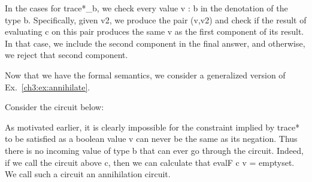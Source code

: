 \documentclass{llncs}
\begin{document}
\begin{definition}
\end{definition}

In the cases for {{trace*_b}}, we check every value {{v : b}} in the
denotation of the type {{b}}. Specifically, given {{v2}}, we produce the pair
{{(v,v2)}} and check if the result of evaluating {{c}} on this pair produces
the same {{v}} as the first component of its result. In that case, we include
the second component in the final answer, and otherwise, we reject that
second component.

Now that we have the formal semantics, we consider a generalized
version of Ex.~\ref{ch3:ex:annihilate}.

\begin{example}[Annihilation]
\label{ch3:ex;annihilation}
Consider the circuit below:
\begin{center}
\end{center}
As motivated earlier, it is clearly impossible for the constraint
implied by {{trace*}} to be satisfied as a boolean value {{v}} can
never be the same as its negation. Thus there is no incoming value of
type {{b}} that can ever go through the circuit. Indeed, if we call
the circuit above {{c}}, then we can calculate that 
{{ evalF c v = emptyset}}. We call such a circuit an 
annihilation circuit.
\end{example}
\end{document}
